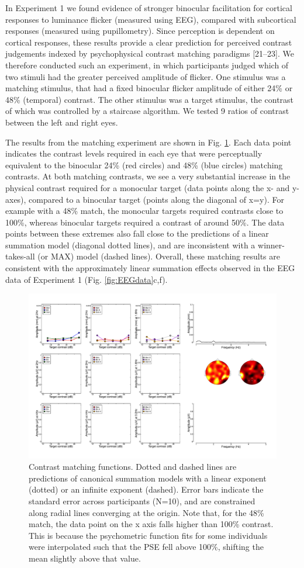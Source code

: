 \documentclass[
]{article}
\begin{document}
In Experiment 1 we found evidence of stronger binocular facilitation for cortical responses to luminance flicker (measured using EEG), compared with subcortical responses (measured using pupillometry). Since perception is dependent on cortical responses, these results provide a clear prediction for perceived contrast judgements indexed by psychophysical contrast matching paradigms {[}21--23{]}. We therefore conducted such an experiment, in which participants judged which of two stimuli had the greater perceived amplitude of flicker. One stimulus was a matching stimulus, that had a fixed binocular flicker amplitude of either 24\% or 48\% (temporal) contrast. The other stimulus was a target stimulus, the contrast of which was controlled by a staircase algorithm. We tested 9 ratios of contrast between the left and right eyes.

The results from the matching experiment are shown in Fig. \ref{fig:matchingdata}. Each data point indicates the contrast levels required in each eye that were perceptually equivalent to the binocular 24\% (red circles) and 48\% (blue circles) matching contrasts. At both matching contrasts, we see a very substantial increase in the physical contrast required for a monocular target (data points along the x- and y-axes), compared to a binocular target (points along the diagonal of x=y). For example with a 48\% match, the monocular targets required contrasts close to 100\%, whereas binocular targets required a contrast of around 50\%. The data points between these extremes also fall close to the predictions of a linear summation model (diagonal dotted lines), and are inconsistent with a winner-takes-all (or MAX) model (dashed lines). Overall, these matching results are consistent with the approximately linear summation effects observed in the EEG data of Experiment 1 (Fig. \ref{fig:EEGdata}c,f).

\begin{figure}

{\centering \includegraphics[width=0.5\linewidth]{Figures/blank} 

}

\caption{Contrast matching functions. Dotted and dashed lines are predictions of canonical summation models with a linear exponent (dotted) or an infinite exponent (dashed). Error bars indicate the standard error across participants (N=10), and are constrained along radial lines converging at the origin. Note that, for the {48\%} match, the data point on the x axis falls higher than {100\%} contrast. This is because the psychometric function fits for some individuals were interpolated such that the PSE fell above {100\%}, shifting the mean slightly above that value.}\label{fig:matchingdata}
\end{figure}
\end{document}
